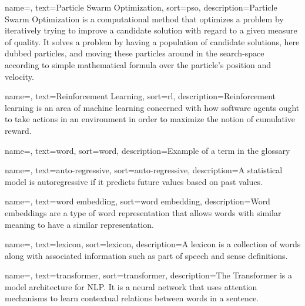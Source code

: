{
    name=,
    text=Particle Swarm Optimization,
    sort=pso,
    description={Particle Swarm Optimization is a computational method that optimizes a problem by iteratively trying to improve a candidate solution with regard to a given measure of quality. It solves a problem by having a population of candidate solutions, here dubbed particles, and moving these particles around in the search-space according to simple mathematical formula over the particle's position and velocity.}
}

{
    name=,
    text=Reinforcement Learning,
    sort=rl,
    description={Reinforcement learning is an area of machine learning concerned with how software agents ought to take actions in an environment in order to maximize the notion of cumulative reward.}
}





{
    name=,
    text=word,
    sort=word,
    description={Example of a term in the glossary}
}

{
    name=,
    text=auto-regressive,
    sort=auto-regressive,
    description={A statistical  model is autoregressive if it predicts future values based on past values.}
}

{
    name=,
    text=word embedding,
    sort=word embedding,
    description={Word embeddings are a type of word representation that allows words with similar meaning to have a similar representation.}
}

{
    name=,
    text=lexicon,
    sort=lexicon,
    description={A lexicon is a collection of words along with associated information such as part of speech and sense definitions.}
}


{
    name=,
    text=transformer,
    sort=transformer,
    description={The Transformer is a model architecture for NLP. It is a neural network that uses attention mechanisms to learn contextual relations between words in a sentence.}
}

